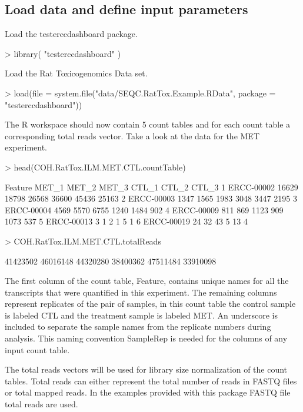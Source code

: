 \documentclass{article}
\begin{document}
\subsection{Load data and define input parameters}
Load the testerccdashboard package. 
\begin{Schunk}
\begin{Sinput}
> library( "testerccdashboard" )
\end{Sinput}
\end{Schunk}
Load the Rat Toxicogenomics Data set.
\begin{Schunk}
\begin{Sinput}
> load(file = system.file("data/SEQC.RatTox.Example.RData", 
                          package = "testerccdashboard"))
\end{Sinput}
\end{Schunk}
The R workspace should now contain 5 count tables and for each count table a 
corresponding total reads vector.
Take a look at the data for the MET experiment.
\begin{Schunk}
\begin{Sinput}
> head(COH.RatTox.ILM.MET.CTL.countTable)
\end{Sinput}
\begin{Soutput}
     Feature MET_1 MET_2 MET_3 CTL_1 CTL_2 CTL_3
1 ERCC-00002 16629 18798 26568 36600 45436 25163
2 ERCC-00003  1347  1565  1983  3048  3447  2195
3 ERCC-00004  4569  5570  6755  1240  1484   902
4 ERCC-00009   811   869  1123   909  1073   537
5 ERCC-00013     3     1     2     1     5     1
6 ERCC-00019    24    32    43     5    13     4
\end{Soutput}
\begin{Sinput}
> COH.RatTox.ILM.MET.CTL.totalReads
\end{Sinput}
\begin{Soutput}
[1] 41423502 46016148 44320280 38400362 47511484 33910098
\end{Soutput}
\end{Schunk}
The first column of the count table, Feature, contains unique names for all
the transcripts that were quantified in this experiment. The remaining columns 
represent replicates of the pair of samples, in this count table 
the control sample is labeled CTL and the treatment sample is labeled MET. An 
underscore is included to separate the sample names from the replicate numbers 
during analysis. This naming convention Sample\textunderscore{}Rep is needed 
for the columns of any input count table.

The total reads vectors will be used for library size normalization of the count
tables. Total reads can either represent the total number of reads in FASTQ 
files or total mapped reads. In the examples provided with this package FASTQ 
file total reads are used.
\end{document}
